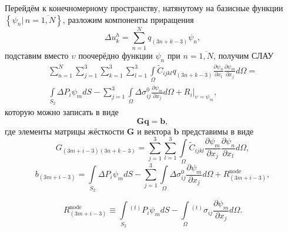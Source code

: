 \documentclass[]{article}
\begin{document}
Перейдём к конечномерному пространству, натянутому на базисные функции $\left\lbrace\psi_{n}|\,n=\overline{1,N}\right\rbrace$, разложим компоненты приращения
\begin{equation}
\Delta u_k^h=\sum_{n=1}^{N}q_{(3n+k-3)}\psi_n,
\label{F:F_alg_var2}
\end{equation}
подставим вместо $\upsilon$ поочерёдно функции $\psi_{n}$ при $n=\overline{1,N}$, получим СЛАУ
\begin{equation}
\begin{gathered}
\sum_{n=1}^{N}\sum_{j=1}^{3}\sum_{k=1}^{3}\sum_{l=1}^{3}
\int\limits_{\Omega}\tilde{C}_{ijkl}q_{(3n+k-3)} \frac{\partial \psi_{n}}{\partial x_{l}} \frac{\partial\psi_{m}}{\partial x_j}d\Omega= \\
\int\limits_{S_{2}}\Delta P_{i}\psi_{m} dS - \sum_{j=1}^{3}\int\limits_{\Omega}\Delta\sigma_{ij}^{0}\frac{\partial\psi_{m}}{\partial x_j}d\Omega+\left.R_{i}\right|_{\upsilon=\psi_{m}},
\end{gathered}
\label{F:F_alg_slau1}
\end{equation}
которую можно записать в виде
\begin{equation}
\mathbf{Gq}=\mathbf{b},
\label{F:F_slau2}
\end{equation}
где элементы матрицы жёсткости $\mathbf{G}$ и вектора $\mathbf{b}$ представимы в виде
\begin{equation}
G_{(3m+i-3)(3n+k-3)}=\sum_{j=1}^{3}\sum_{l=1}^{3}\int\limits_{\Omega}\tilde{C}_{ijkl}\frac{\partial\psi_{m}}{\partial x_j}\frac{\partial \psi_{n}}{\partial x_{l}}d\Omega,
\label{F:F_slau3}
\end{equation}
\begin{equation}
b_{(3m+i-3)}=\int\limits_{S_{2}}\Delta P_{i}\psi_{m} dS - \sum_{j=1}^{3}\int\limits_{\Omega}\Delta\sigma_{ij}^{0}\frac{\partial\psi_{m}}{\partial x_j}d\Omega+R_{(3m+i-3)}^{\mathrm{node}},
\label{F:F_slau4}
\end{equation}

\begin{equation}
R_{(3m+i-3)}^{\mathrm{node}} \equiv \int\limits_{S_{2}}{}^{(t)}P_{i} \psi_{m} dS - \int\limits_{\Omega}{}^{(t)}\sigma_{ij}\frac{\partial\psi_{m}}{\partial x_j} d\Omega.
\label{F:F_slau4_add}
\end{equation}
\end{document}
